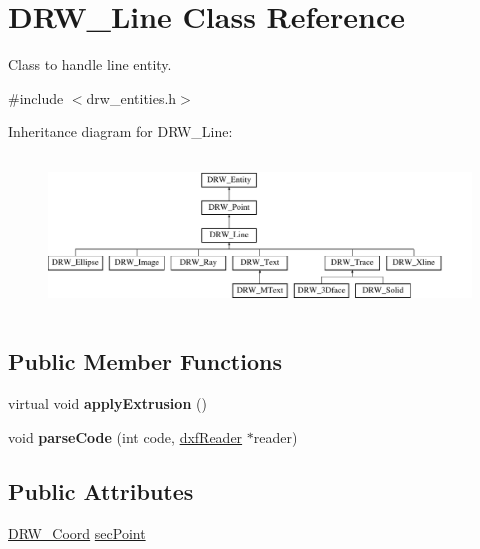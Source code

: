 \hypertarget{classDRW__Line}{\section{D\-R\-W\-\_\-\-Line Class Reference}
\label{classDRW__Line}
}


Class to handle line entity.  




{\ttfamily \#include $<$drw\-\_\-entities.\-h$>$}

Inheritance diagram for D\-R\-W\-\_\-\-Line\-:\begin{figure}[H]
\begin{center}
\leavevmode
\includegraphics[height=4.166667cm]{classDRW__Line}
\end{center}
\end{figure}
\subsection*{Public Member Functions}
\begin{DoxyCompactItemize}
\item 
\hypertarget{classDRW__Line_a6aab28594c628f6330bfcb030d1a20c4}{virtual void {\bfseries apply\-Extrusion} ()}\label{classDRW__Line_a6aab28594c628f6330bfcb030d1a20c4}

\item 
\hypertarget{classDRW__Line_a4f9ccc26eb9f6e4b7cd8cdb743fd681a}{void {\bfseries parse\-Code} (int code, \hyperlink{classdxfReader}{dxf\-Reader} $\ast$reader)}\label{classDRW__Line_a4f9ccc26eb9f6e4b7cd8cdb743fd681a}

\end{DoxyCompactItemize}
\subsection*{Public Attributes}
\begin{DoxyCompactItemize}
\item 
\hyperlink{classDRW__Coord}{D\-R\-W\-\_\-\-Coord} \hyperlink{classDRW__Line_afba62212864227b610be3e2a4e7ac307}{sec\-Point}
\end{DoxyCompactItemize}
